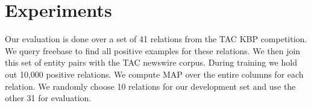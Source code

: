 \section{Experiments}

Our evaluation is done over a set of 41 relations from the TAC KBP competition.
We query freebase to find all positive examples for these relations.
We then join this set of entity pairs with the TAC newswire corpus.
During training we hold out 10,000 positive relations.
We compute MAP over the entire columns for each relation.
We randomly choose 10 relations for our development set and use the other 31 for evaluation.